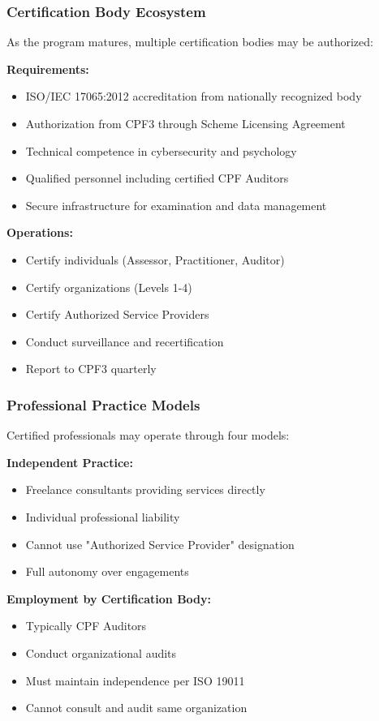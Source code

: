 \documentclass[11pt,a4paper]{article}
\begin{document}
\subsubsection{Certification Body Ecosystem}

As the program matures, multiple certification bodies may be authorized:

\textbf{Requirements:}
\begin{itemize}
\item ISO/IEC 17065:2012 accreditation from nationally recognized body
\item Authorization from CPF3 through Scheme Licensing Agreement
\item Technical competence in cybersecurity and psychology
\item Qualified personnel including certified CPF Auditors
\item Secure infrastructure for examination and data management
\end{itemize}

\textbf{Operations:}
\begin{itemize}
\item Certify individuals (Assessor, Practitioner, Auditor)
\item Certify organizations (Levels 1-4)
\item Certify Authorized Service Providers
\item Conduct surveillance and recertification
\item Report to CPF3 quarterly
\end{itemize}

\subsubsection{Professional Practice Models}

Certified professionals may operate through four models:

\textbf{Independent Practice:}
\begin{itemize}
\item Freelance consultants providing services directly
\item Individual professional liability
\item Cannot use "Authorized Service Provider" designation
\item Full autonomy over engagements
\end{itemize}

\textbf{Employment by Certification Body:}
\begin{itemize}
\item Typically CPF Auditors
\item Conduct organizational audits
\item Must maintain independence per ISO 19011
\item Cannot consult and audit same organization
\end{itemize}
\end{document}
